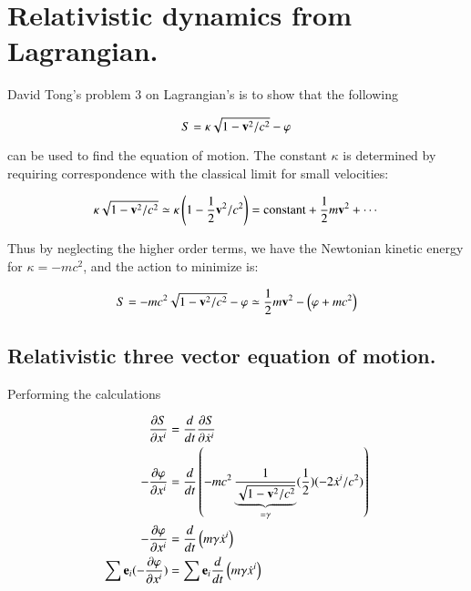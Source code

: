 \documentclass{article}      %
\title{} %
\author{Peeter Joot}         %
\newcommand{\PD}[2]{ \frac{\partial{#1}}{\partial {#2}} }
\begin{document}

\maketitle{}

\section{ Relativistic dynamics from Lagrangian. }

David Tong's problem 3 on Lagrangian's is to show that the following

\begin{equation}
S = \kappa \sqrt{1 - \mathbf{v}^2/c^2} - \varphi
\end{equation}

can be used to find the equation of motion.  The constant $\kappa$ is determined
by requiring correspondence with the classical limit for small velocities:

\begin{equation*}
\kappa \sqrt{1 - \mathbf{v}^2/c^2} \simeq \kappa \left( 1 - \frac{1}{2} \mathbf{v}^2/c^2 \right) = \text{constant} + \frac{1}{2} m \mathbf{v}^2 + \cdots
\end{equation*}

Thus by neglecting the higher order terms, we have the Newtonian kinetic energy for $\kappa = -mc^2$, and the action to minimize is:

\begin{equation}
S = -m c^2\sqrt{1 - \mathbf{v}^2/c^2} - \varphi \simeq \frac{1}{2}m \mathbf{v}^2 - \left(\varphi + m c^2\right)
\end{equation}

\subsection{ Relativistic three vector equation of motion. }

Performing the calculations

\begin{align*}
\PD{S}{x^i} &= \frac{d}{dt} \PD{S}{\dot{x}^i} \\
-\PD{\varphi}{x^i} &= \frac{d}{dt} \left(-mc^2 \underbrace{\inv{\sqrt{1-\Bv^2/c^2}}}_{=\gamma} (\inv{2})(-2\dot{x}^i/c^2)\right) \\
-\PD{\varphi}{x^i} &= \frac{d}{dt} \left( m \gamma \dot{x}^i\right) \\
\sum \Be_i (-\PD{\varphi}{x^i}) &= \sum \Be_i \frac{d}{dt} \left( m \gamma \dot{x}^i\right) \\
\end{align*}
\end{document}
